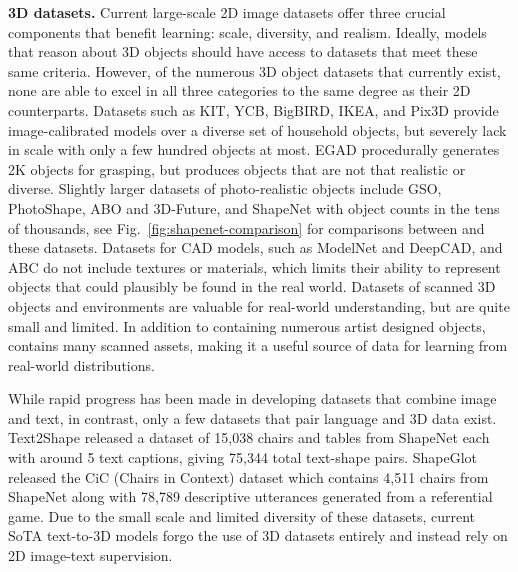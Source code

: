 \textbf{3D datasets.}
Current large-scale 2D image datasets offer three crucial components that benefit learning: scale, diversity, and realism. Ideally, models that reason about 3D objects should have access to datasets that meet these same criteria. However, of the numerous 3D object datasets that currently exist, none are able to excel in all three categories to the same degree as their 2D counterparts. 
Datasets such as KIT\cite{kasper2012kit}, YCB\cite{calli2015benchmarking}, BigBIRD\cite{Singh2014BigBIRDAL}, IKEA\cite{lim2013parsing}, and Pix3D\cite{sun2018pix3d} provide image-calibrated models over a diverse set of household objects, but severely lack in scale with only a few hundred objects at most. EGAD\cite{morrison2020egad} procedurally generates 2K objects for grasping, but produces objects that are not that realistic or diverse. Slightly larger datasets of photo-realistic objects include GSO\cite{downs2022google}, PhotoShape\cite{park2018photoshape}, ABO\cite{collins2022abo} and 3D-Future\cite{fu20213d}, and ShapeNet\cite{chang2015shapenet} with object counts in the tens of thousands, see Fig.~\ref{fig:shapenet-comparison} for comparisons between \data and these datasets. Datasets for CAD models, such as ModelNet\cite{wu20153d} and DeepCAD\cite{wu2021deepcad}, and ABC\cite{koch2019abc} do not include textures or materials, which limits their ability to represent objects that could plausibly be found in the real world. Datasets of scanned 3D objects and environments are valuable for real-world understanding\cite{couprie2013indoor,dai2017scannet,choi2016large,levoy2000digital}, but are quite small and limited. In addition to containing numerous artist designed objects, \data contains many scanned assets, making it a useful source of data for learning from real-world distributions.

While rapid progress has been made in developing datasets that combine image and text, in contrast, only a few datasets that pair language and 3D data exist. Text2Shape\cite{chen2018text2shape} released a dataset of 15,038 chairs and tables from ShapeNet each with around 5 text captions, giving 75,344 total text-shape pairs. ShapeGlot\cite{achlioptas2019shapeglot} released the CiC (Chairs in Context) dataset which contains 4,511 chairs from ShapeNet along with 78,789 descriptive utterances generated from a referential game. Due to the small scale and limited diversity of these datasets, current SoTA text-to-3D models\cite{michel2022text2mesh,poole2022dreamfusion,jain2022zero} forgo the use of 3D datasets entirely and instead rely on 2D image-text supervision.

